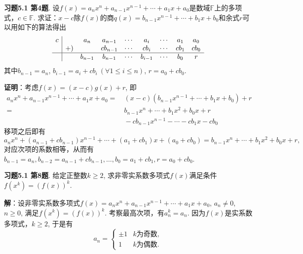 
\renewcommand{\newpageorvspace}{\vspace{2em}}

\date{2021-12-10  第六次习题课}



\maketitle

{\bf 习题5.1 第4题}. 设$f(x) = a_nx^n + a_{n-1}x^{n-1} + \cdots + a_1x + a_0$是数域$\mathbb{F}$上的多项式，$c\in\mathbb{F}$. 求证：$x-c$除$f(x)$的商$q(x) = b_{n-1}x^{n-1} + \cdots + b_1x + b_0$和余式$r$可以用如下的算法得出
$$
\begin{array}{c|cccccccc}
c & & a_n & a_{n-1} & \cdots & a_i & \cdots & a_1 & a_0 \\
& +) & & cb_{n-1} & \cdots & cb_i & \cdots & cb_1 & cb_0 \\ \hline
& & b_{n-1} & b_{n-1} & \cdots & b_{i-1} & \cdots & b_0 & r
\end{array}
$$
其中$b_{n-1} = a_n$, $b_{i-1} = a_i + cb_i \ (\forall 1 \leqslant i \leqslant n)$, $r = a_0 + cb_0$.

{\bf 证明}：考虑$f(x) = (x-c)g(x) + r$, 即
\begin{align*}
a_nx^n + a_{n-1}x^{n-1} + \cdots + a_1x + a_0 = & \ (x-c) (b_{n-1}x^{n-1} + \cdots + b_1x + b_0) + r \\
= & \ b_{n-1}x^{n} + \cdots + b_1x^2 + b_0x + r \\
& \ - cb_{n-1}x^{n-1} - \cdots - cb_1x - cb_0
\end{align*}
移项之后即有
$$a_nx^n + (a_{n-1}+cb_{n-1})x^{n-1} + \cdots + (a_1+cb_1)x + (a_0 + cb_0) = b_{n-1}x^{n} + \cdots + b_1x^2 + b_0x + r,$$
对应次项的系数相等，从而有$b_{n-1} = a_n, b_{n-2} = a_{n-1}+cb_{n-1}, \ldots, b_0 = a_1+cb_1, r = a_0 + cb_0$.

\newpageorvspace


{\bf 习题5.1 第8题}. 给定正整数$k\geqslant 2$, 求非零实系数多项式$f(x)$满足条件$f(x^k) = (f(x))^k$.

{\bf 解}：设非零实系数多项式$f(x) = a_nx^n + a_{n-1}x^{n-1} + \cdots + a_1x + a_0$, $a_n\neq 0$, $n\geqslant 0$, 满足$f(x^k) = (f(x))^k$. 考察最高次项，有$a_n^k = a_n$. 因为$f(x)$是实系数多项式，$k\geqslant 2$, 于是有
$$a_n = \begin{cases}\pm 1 & \text{$k$为奇数}, \\ 1 & \text{$k$为偶数}. \end{cases}$$

